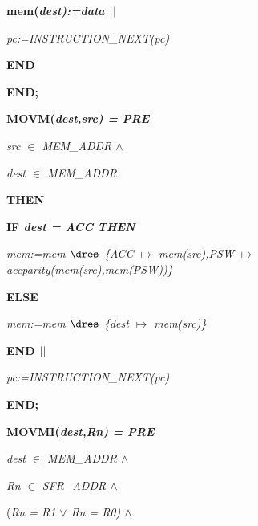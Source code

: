 \begin{sloppypar}
\hspace*{0.30in}\bf mem\rm (\it dest\rm )\rm :=\it data  $\mbox{$\mid\mid$}$ 

\hspace*{0.30in}\it pc\rm :=\it INSTRUCTION\_NEXT\rm (\it pc\rm )

\hspace*{0.20in}\bf END

\hspace*{0.10in}\bf END\rm ;

\hspace*{0.10in}\bf MOVM\rm (\it dest\rm ,\it src\rm ) \rm = \bf PRE

\hspace*{0.20in}\it src $\in$  \it MEM\_ADDR  $\land$ 

\hspace*{0.20in}\it dest $\in$  \it MEM\_ADDR

\hspace*{0.10in}\bf THEN

\hspace*{0.20in}\bf IF \it dest \rm = \it ACC \bf THEN

\hspace*{0.30in}\it mem\rm :=\it mem $\lover$ \rm \{\it ACC $\mapsto$ \it mem\rm (\it src\rm )\rm ,\it PSW $\mapsto$ \it accparity\rm (\it mem\rm (\it src\rm )\rm ,\it mem\rm (\it PSW\rm )\rm )\rm \}

\hspace*{0.20in}\bf ELSE

\hspace*{0.30in}\it mem\rm :=\it mem $\lover$ \rm \{\it dest $\mapsto$ \it mem\rm (\it src\rm )\rm \}

\hspace*{0.20in}\bf END  $\mbox{$\mid\mid$}$ 

\hspace*{0.20in}\it pc\rm :=\it INSTRUCTION\_NEXT\rm (\it pc\rm )

\hspace*{0.10in}\bf END\rm ;

\hspace*{0.10in}\bf MOVMI\rm (\it dest\rm ,\it Rn\rm ) \rm = \bf PRE

\hspace*{0.20in}\it dest $\in$  \it MEM\_ADDR  $\land$ 

\hspace*{0.20in}\it Rn $\in$  \it SFR\_ADDR  $\land$ 

\hspace*{0.20in}\rm (\it Rn \rm = \it R1  $\lor$  \it Rn \rm = \it R0\rm )  $\land$ 


\end{sloppypar}

